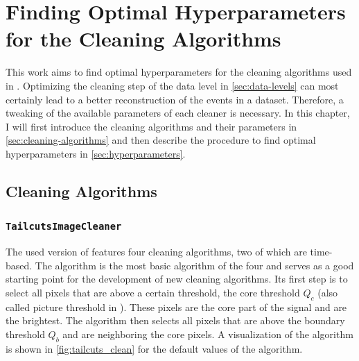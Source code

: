 \chapter{Finding Optimal Hyperparameters for the Cleaning Algorithms}%
\label{ch:finding-hyperparams}

This work aims to find optimal hyperparameters for the cleaning algorithms used in \ctapipe{}.
Optimizing the cleaning step of the \dlo{} data level in \autoref{sec:data-levels} can most certainly lead to a better
reconstruction of the events in a dataset. Therefore, a tweaking of the available parameters of each
cleaner is necessary. In this chapter, I will first introduce the cleaning algorithms and their parameters
in \autoref{sec:cleaning-algorithms} and then describe the procedure to find optimal hyperparameters
in \autoref{sec:hyperparameters}.
\vspace{-0.5cm}
\section{Cleaning Algorithms}%
\label{sec:cleaning-algorithms}
\vspace{-0.5cm}
\subsection*{\texttt{TailcutsImageCleaner}}%
\vspace{-0.5cm}
The used version of \ctapipe{} features four cleaning algorithms, two of which are time-based.
The \tailcuts{} algorithm is the most basic algorithm of the four and serves as a good
starting point for the development of new cleaning algorithms. Its first step is to select all
pixels that are above a certain threshold, the core threshold \(Q_c\) (also called picture threshold in \ctapipe{}). These
pixels are the core part of the signal and are the brightest. The \tailcuts{} algorithm
then selects all pixels that are above the boundary threshold \(Q_b\) and are neighboring
the core pixels. A visualization of the algorithm is shown in \autoref{fig:tailcuts_clean} for the
default values of the algorithm.

